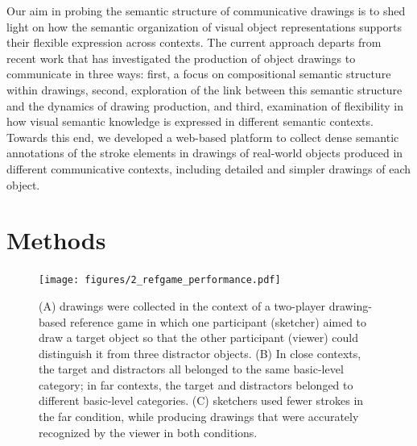 \documentclass[10pt,letterpaper]{article}
\begin{document}
Our aim in probing the semantic structure of communicative drawings is to shed light on how the semantic organization of visual object representations supports their flexible expression across contexts. 
The current approach departs from recent work \cite{FanCommon2018} that has investigated the production of object drawings to communicate in three ways: 
first, a focus on compositional semantic structure within drawings,
second, exploration of the link between this semantic structure and the dynamics of drawing production,
and third, examination of flexibility in how visual semantic knowledge is expressed in different semantic contexts. 
Towards this end, we developed a web-based platform to collect dense semantic annotations of the stroke elements in drawings of real-world objects produced in different communicative contexts, including detailed and simpler drawings of each object. 


\section{Methods}

\begin{figure}[htbp]
\centering
\texttt{[image: figures/2\_refgame\_performance.pdf]}
\caption{(A) drawings were collected in the context of a two-player drawing-based reference game in which one participant (sketcher) aimed to draw a target object so that the other participant (viewer) could distinguish it from three distractor objects. (B) In close contexts, the target and distractors all belonged to the same basic-level category; in far contexts, the target and distractors belonged to different basic-level categories. (C) sketchers used fewer strokes in the far condition, while producing drawings that were accurately recognized by the viewer in both conditions.}
\label{refgame_performance}
\end{figure}
\end{document}
